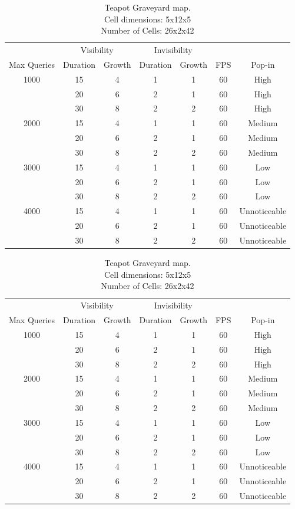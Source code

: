 \documentclass[12pt]{ucthesis}
\newcommand{\captionfonts}{\small\bf\ssp}
\begin{document}
\begin{table}
\begin{center}
\begin{tabular}{|c|c|c|c|c|c|c|}
\hline 
&\multicolumn{2}{c|}{Visibility}&\multicolumn{2}{c|}{Invisibility}&&
\tabularnewline
Max Queries&Duration&Growth&Duration&Growth&FPS&Pop-in
\tabularnewline
\hline
1000 & 15& 4& 1& 1& 60& High
\tabularnewline
& 20& 6& 2& 1& 60& High
\tabularnewline
& 30& 8& 2& 2& 60& High
\tabularnewline \hline
2000 & 15& 4& 1& 1& 60& Medium
\tabularnewline
& 20& 6& 2& 1& 60& Medium
\tabularnewline
& 30& 8& 2& 2& 60& Medium
\tabularnewline \hline
3000 & 15& 4& 1& 1& 60& Low
\tabularnewline
& 20& 6& 2& 1& 60& Low
\tabularnewline
& 30& 8& 2& 2& 60& Low
\tabularnewline \hline 
4000 & 15& 4& 1& 1& 60& Unnoticeable
\tabularnewline 
& 20& 6& 2& 1& 60& Unnoticeable
\tabularnewline
& 30& 8& 2& 2& 60& Unnoticeable
\tabularnewline \hline 
\end{tabular}
\captionfonts
\caption[Performance for Teapot Graveyard]{Teapot Graveyard map.\\Cell dimensions: 5x12x5\\Number of Cells: 26x2x42}
\label{table:teapot-performance-b}
\end{center}
\end{table}

\begin{table}
\begin{center}
\begin{tabular}{|c|c|c|c|c|c|c|}
\hline 
&\multicolumn{2}{c|}{Visibility}&\multicolumn{2}{c|}{Invisibility}&&
\tabularnewline
Max Queries&Duration&Growth&Duration&Growth&FPS&Pop-in
\tabularnewline
\hline
1000 & 15& 4& 1& 1& 60& High
\tabularnewline
& 20& 6& 2& 1& 60& High
\tabularnewline
& 30& 8& 2& 2& 60& High
\tabularnewline \hline
2000 & 15& 4& 1& 1& 60& Medium
\tabularnewline
& 20& 6& 2& 1& 60& Medium
\tabularnewline
& 30& 8& 2& 2& 60& Medium
\tabularnewline \hline
3000 & 15& 4& 1& 1& 60& Low
\tabularnewline
& 20& 6& 2& 1& 60& Low
\tabularnewline
& 30& 8& 2& 2& 60& Low
\tabularnewline \hline 
4000 & 15& 4& 1& 1& 60& Unnoticeable
\tabularnewline 
& 20& 6& 2& 1& 60& Unnoticeable
\tabularnewline
& 30& 8& 2& 2& 60& Unnoticeable
\tabularnewline \hline 
\end{tabular}
\captionfonts
\caption[Performance for Teapot Graveyard]{Teapot Graveyard map.\\Cell dimensions: 5x12x5\\Number of Cells: 26x2x42}
\label{table:teapot-performance-c}
\end{center}
\end{table}
\end{document}
